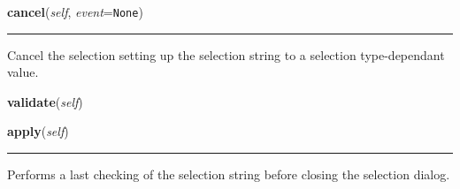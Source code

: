    \vspace{0.5ex}

\hspace{.8\funcindent}\begin{boxedminipage}{\funcwidth}

    \raggedright \textbf{cancel}(\textit{self}, \textit{event}={\tt None})

    \vspace{-1.5ex}

    \rule{\textwidth}{0.5\fboxrule}
\setlength{\parskip}{2ex}
    Cancel the selection setting up the selection string to a selection 
    type-dependant value.

\setlength{\parskip}{1ex}
    \end{boxedminipage}

    \label{nMOLDYN:GUI:SelectionDialog:SelectionDialog:validate}

    \vspace{0.5ex}

\hspace{.8\funcindent}\begin{boxedminipage}{\funcwidth}

    \raggedright \textbf{validate}(\textit{self})

\setlength{\parskip}{2ex}
\setlength{\parskip}{1ex}
    \end{boxedminipage}

    \label{nMOLDYN:GUI:SelectionDialog:SelectionDialog:apply}

    \vspace{0.5ex}

\hspace{.8\funcindent}\begin{boxedminipage}{\funcwidth}

    \raggedright \textbf{apply}(\textit{self})

    \vspace{-1.5ex}

    \rule{\textwidth}{0.5\fboxrule}
\setlength{\parskip}{2ex}
    Performs a last checking of the selection string before closing the 
    selection dialog.

\setlength{\parskip}{1ex}
    \end{boxedminipage}

